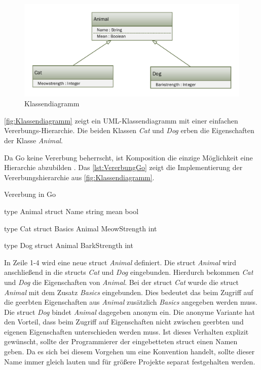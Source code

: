 \begin{figure}[H]
    \centering
    \includegraphics[width=\textwidth]{Images/Klassendiagramm.pdf}
    \caption{Klassendiagramm}
    \label{fig:Klassendiagramm}
\end{figure}

\autoref{fig:Klassendiagramm} zeigt ein UML-Klassendiagramm mit einer einfachen Vererbungs-Hierarchie.
Die beiden Klassen \emph{Cat} und \emph{Dog} erben die Eigenschaften der Klasse \emph{Animal}.


Da Go keine Vererbung beherrscht, ist Komposition die einzige Möglichkeit eine Hierarchie abzubilden \cite[]{Kennedy.2016}.
Das \autoref{lst:VererbungGo} zeigt die Implementierung der Vererbungshierarchie aus \autoref{fig:Klassendiagramm}.

\begin{listing}[H]
\caption{Vererbung in Go \cite{Kennedy.2016}}
\label{lst:VererbungGo}
\begin{GoCode}
type Animal struct {
    Name string
    mean bool
}

type Cat struct {
    Basics Animal
    MeowStrength int
}

type Dog struct {
    Animal
    BarkStrength int
}
\end{GoCode}
\end{listing}

In Zeile 1-4 wird eine neue struct \emph{Animal} definiert.
Die struct \emph{Animal} wird anschließend in die structs \emph{Cat} und \emph{Dog} eingebunden. 
Hierdurch bekommen \emph{Cat} und \emph{Dog} die Eigenschaften von \emph{Animal}.
Bei der struct \emph{Cat} wurde die struct \emph{Animal} mit dem Zusatz \emph{Basics} eingebunden. 
Dies bedeutet das beim Zugriff auf die geerbten Eigenschaften aus \emph{Animal} zusätzlich \emph{Basics} angegeben werden muss. 
Die struct \emph{Dog} bindet \emph{Animal} dagegeben anonym ein. 
Die anonyme Variante hat den Vorteil, dass beim Zugriff auf Eigenschaften nicht zwischen geerbten und eigenen Eigenschaften unterschieden werden muss.
Ist dieses Verhalten explizit gewünscht, sollte der Programmierer der eingebetteten struct einen Namen geben.
Da es sich bei diesem Vorgehen um eine Konvention handelt, sollte dieser Name immer gleich lauten und für größere Projekte separat festgehalten werden. 

